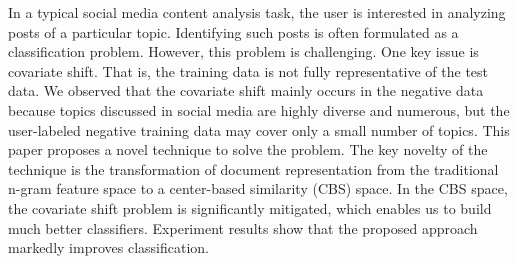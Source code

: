 In a typical social media content analysis task, the user is interested in analyzing posts of a particular topic. Identifying such posts is often formulated as a classification problem. However, this problem is challenging. One key issue is covariate shift. That is, the training data is not fully representative of the test data. We observed that the covariate shift mainly occurs in the negative data because topics discussed in social media are highly diverse and numerous, but the user-labeled negative training data may cover only a small number of topics. This paper proposes a novel technique to solve the problem. The key novelty of the technique is the transformation of document representation from the traditional n-gram feature space to a center-based similarity (CBS) space. In the CBS space, the covariate shift problem is significantly mitigated, which enables us to build much better classifiers. Experiment results show that the proposed approach markedly improves classification.
